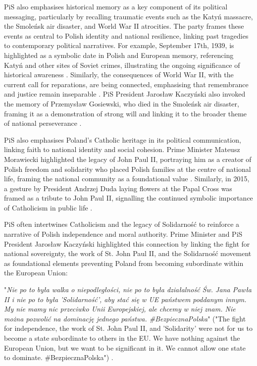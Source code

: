 PiS also emphasises historical memory as a key component of its political messaging, particularly by recalling traumatic events such as the Katyń massacre, the Smoleńsk air disaster, and World War II atrocities. The party frames these events as central to Polish identity and national resilience, linking past tragedies to contemporary political narratives. For example, September 17th, 1939, is highlighted as a symbolic date in Polish and European memory, referencing Katyń and other sites of Soviet crimes, illustrating the ongoing significance of historical awareness \citep{pisorgpl2023j}. Similarly, the consequences of World War II, with the current call for reparations, are being connected, emphasising that remembrance and justice remain inseparable \citep{pisorgpl2023k}. PiS President Jarosław Kaczyński also invoked the memory of Przemysław Gosiewski, who died in the Smoleńsk air disaster, framing it as a demonstration of strong will and linking it to the broader theme of national perseverance \citep{pisorgpl2023j}.

PiS also emphasises Poland's Catholic heritage in its political communication, linking faith to national identity and social cohesion. Prime Minister Mateusz Morawiecki highlighted the legacy of John Paul II, portraying him as a creator of Polish freedom and solidarity who placed Polish families at the centre of national life, framing the national community as a foundational value \citep{pisorgpl2023m}. Similarly, in 2015, a gesture by President Andrzej Duda laying flowers at the Papal Cross was framed as a tribute to John Paul II, signalling the continued symbolic importance of Catholicism in public life \citep{jbrudzinski2015}.

PiS often intertwines Catholicism and the legacy of Solidarność to reinforce a narrative of Polish independence and moral authority. Prime Minister and PiS President Jarosław Kaczyński highlighted this connection by linking the fight for national sovereignty, the work of St. John Paul II, and the Solidarność movement as foundational elements preventing Poland from becoming subordinate within the European Union:

\begin{displayquote}
    "\textit{Nie po to była walka o niepodległości, nie po to była działalność Św. Jana Pawła II i nie po to była 'Solidarność', aby stać się w UE państwem poddanym innym. My nie mamy nic przeciwko Unii Europejskiej, ale chcemy w niej znam. Nie można pozwolić na dominację jednego państwa. \#BezpiecznaPolska}" ("The fight for independence, the work of St. John Paul II, and 'Solidarity' were not for us to become a state subordinate to others in the EU. We have nothing against the European Union, but we want to be significant in it. We cannot allow one state to dominate. \#BezpiecznaPolska") \citep{pisorgpl2023n}.
\end{displayquote}

